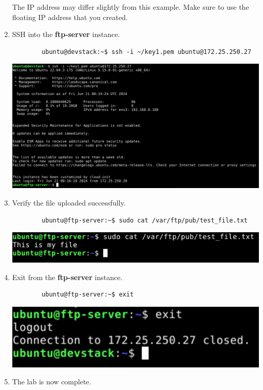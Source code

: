 \documentclass[letterpaper, 12pt]{article}
\begin{document}
\begin{enumerate}
    \begin{notebox}
        The IP address may differ slightly from this example.
        Make sure to use the floating IP address that you created.
    \end{notebox}

    \item SSH into the \textbf{ftp-server} instance.
    \begin{lstlisting}
        ubuntu@devstack:~$ ssh -i ~/key1.pem ubuntu@172.25.250.27
    \end{lstlisting}

    \begin{center}
        \includegraphics[width=\linewidth]{images/part2/step20.png}
    \end{center}

    \item Verify the file uploaded successfully.
    \begin{lstlisting}
        ubuntu@ftp-server:~$ sudo cat /var/ftp/pub/test_file.txt
    \end{lstlisting}

    \begin{center}
        \includegraphics[width=\linewidth]{images/part2/step21.png}
    \end{center}

    \item Exit from the \textbf{ftp-server} instance.
    \begin{lstlisting}
        ubuntu@ftp-server:~$ exit
    \end{lstlisting}

    \begin{center}
        \includegraphics[width=\linewidth]{images/part2/step22.png}
    \end{center}

    \item The lab is now complete.

\end{enumerate}
\end{document}
